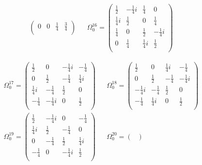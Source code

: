 \begin{align*}
\begin{pmatrix}
    0  &  0  &  \frac{1}{4}  &  \frac{3}{4}  \\
    \end{pmatrix}
    &&
    \Omega_{0}^{16} = 
    \begin{pmatrix}
    \frac{1}{2}  &  -\frac{1}{4}i  &  \frac{1}{4}  &  0  \\
    \frac{1}{4}i  &  \frac{1}{2}  &  0  &  \frac{1}{4}  \\
    \frac{1}{4}  &  0  &  \frac{1}{2}  &  -\frac{1}{4}i  \\
    0  &  \frac{1}{4}  &  \frac{1}{4}i  &  \frac{1}{2}  \\
    \end{pmatrix}
\end{align*}

\newpage
\begin{align*}
    \Omega_{0}^{17} = 
    \begin{pmatrix}
    \frac{1}{2}  &  0  &  -\frac{1}{4}i  &  -\frac{1}{4}  \\
    0  &  \frac{1}{2}  &  -\frac{1}{4}  &  \frac{1}{4}i  \\
    \frac{1}{4}i  &  -\frac{1}{4}  &  \frac{1}{2}  &  0  \\
    -\frac{1}{4}  &  -\frac{1}{4}i  &  0  &  \frac{1}{2}  \\
    \end{pmatrix}
    &&
    \Omega_{0}^{18} = 
    \begin{pmatrix}
    \frac{1}{2}  &  0  &  \frac{1}{4}i  &  -\frac{1}{4}  \\
    0  &  \frac{1}{2}  &  -\frac{1}{4}  &  -\frac{1}{4}i  \\
    -\frac{1}{4}i  &  -\frac{1}{4}  &  \frac{1}{2}  &  0  \\
    -\frac{1}{4}  &  \frac{1}{4}i  &  0  &  \frac{1}{2}  \\
    \end{pmatrix}
    \\
    \Omega_{0}^{19} = 
    \begin{pmatrix}
    \frac{1}{2}  &  -\frac{1}{4}i  &  0  &  -\frac{1}{4}  \\
    \frac{1}{4}i  &  \frac{1}{2}  &  -\frac{1}{4}  &  0  \\
    0  &  -\frac{1}{4}  &  \frac{1}{2}  &  \frac{1}{4}i  \\
    -\frac{1}{4}  &  0  &  -\frac{1}{4}i  &  \frac{1}{2}  \\
    \end{pmatrix}
    &&
    \Omega_{0}^{20} = 
    \begin{pmatrix}

\end{pmatrix}
\end{align*}
